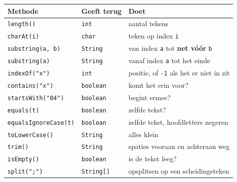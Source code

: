 \documentclass[a4paper,11pt]{article}
\begin{document}
\begin{center}
    \begin{tabular}{@{}llp{5.9cm}@{}}
        \toprule
        \textbf{Methode}             & \textbf{Geeft terug} & \textbf{Doet}                                             \\
        \midrule
        \texttt{length()}            & \texttt{int}         & aantal tekens                                             \\
        \texttt{charAt(i)}           & \texttt{char}        & teken op index \texttt{i}                                 \\
        \texttt{substring(a, b)}     & \texttt{String}      & van index \texttt{a} tot \textbf{net v\'o\'or} \texttt{b} \\
        \texttt{substring(a)}        & \texttt{String}      & vanaf index \texttt{a} tot het einde                      \\
        \texttt{indexOf("x")}        & \texttt{int}         & positie, of \texttt{-1} als het er niet in zit            \\
        \texttt{contains("x")}       & \texttt{boolean}     & komt het erin voor?                                       \\
        \texttt{startsWith("04")}    & \texttt{boolean}     & begint ermee?                                             \\
        \texttt{equals(t)}           & \texttt{boolean}     & zelfde tekst?                                             \\
        \texttt{equalsIgnoreCase(t)} & \texttt{boolean}     & zelfde tekst, hoofdletters negeren                        \\
        \texttt{toLowerCase()}       & \texttt{String}      & alles klein                                               \\
        \texttt{trim()}              & \texttt{String}      & spaties vooraan en achteraan weg                          \\
        \texttt{isEmpty()}           & \texttt{boolean}     & is de tekst leeg?                                         \\
        \texttt{split(";")}          & \texttt{String[]}    & opsplitsen op een scheidingsteken                         \\
        \bottomrule
    \end{tabular}
\end{center}
\end{document}
